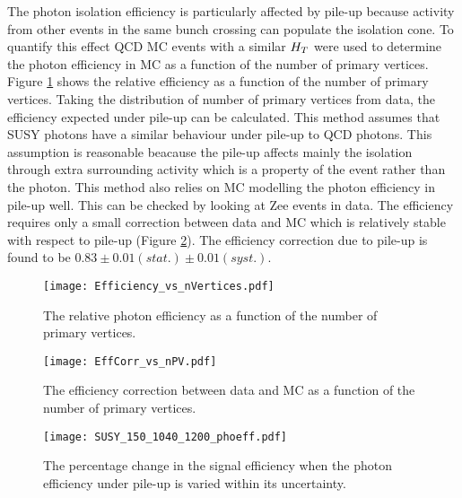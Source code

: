 The photon isolation efficiency is particularly affected by pile-up because
activity from other events in the same bunch crossing can populate the isolation
cone. To quantify this effect QCD MC events with a similar $H_{T}$ were used to
determine the photon efficiency in MC as a function of the number of primary
vertices. Figure \ref{fig:Efficiency_vs_nVertices} shows the relative efficiency
as a function of the number of primary vertices. Taking the distribution of 
number of primary vertices from data, the efficiency expected under pile-up can 
be calculated. This method assumes that SUSY photons have a similar behaviour 
under pile-up to QCD photons. This assumption is reasonable beacause the pile-up 
affects mainly the isolation through extra surrounding activity which is a 
property of the event rather than the photon. This method also relies on MC 
modelling the photon efficiency in pile-up well. This can be checked by looking 
at Zee events in data. The efficiency requires only a small correction between 
data and MC which is relatively stable with respect to pile-up (Figure 
\ref{fig:EffCorr_vs_nPV}). The efficiency correction due to pile-up is found to 
be $0.83\pm0.01(stat.)\pm0.01(syst.)$. \\

\begin{figure}
\begin{center}
\texttt{[image: Efficiency\_vs\_nVertices.pdf]}
\end{center}
\caption{The relative photon efficiency as a function of the number of primary 
vertices.}
\label{fig:Efficiency_vs_nVertices}
\end{figure}

\begin{figure}
\begin{center}
\texttt{[image: EffCorr\_vs\_nPV.pdf]}
\end{center}
\caption{The efficiency correction between data and MC as a function of the
number of primary vertices.}
\label{fig:EffCorr_vs_nPV}
\end{figure}

\begin{figure}
\begin{center}
\texttt{[image: SUSY\_150\_1040\_1200\_phoeff.pdf]}
\end{center}
\caption{The percentage change in the signal efficiency when the photon
efficiency under pile-up is varied within its uncertainty.} 
\label{fig:phoeff_Numbers}
\end{figure}

